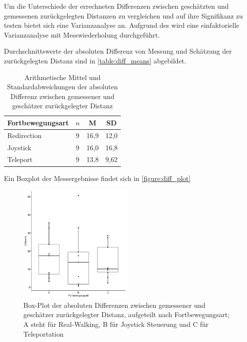                     Um die Unterschiede der errechneten Differenzen zwischen geschätzten und gemessenen zurückgelegten Distanzen zu vergleichen und auf ihre Signifikanz zu testen bietet sich eine Varianzanalyse an.
                    Aufgrund des  wird eine einfaktorielle Varianzanalyse mit Messwiederholung durchgeführt.

                    Durchschnittswerte der absoluten Differenz von Messung und Schätzung der zurückgelegten Distanz sind in \autoref{table:diff_means} abgebildet.

                    \begin{table}[!h]
                        \renewcommand\arraystretch{1.2}
                        \centering
                        \begin{tabular}{lccc} \toprule
                            Fortbewegungsart& $n$ & M    & SD   \\ \midrule
                            Redirection     & $9$ & 16,9 & 12,0 \\
                            Joystick        & $9$ & 16,0 & 16,8 \\
                            Teleport        & $9$ & 13,8 & 9,62 \\ \bottomrule
                        \end{tabular}
                        \caption{Arithmetische Mittel und Standardabweichungen der absoluten Differenz zwischen gemessener und geschätzer zurückgelegter Distanz}\label{table:diff_means}
                    \end{table}

                    Ein Boxplot der Messergebnisse findet sich in \autoref{figure:diff_plot}

                    \begin{figure}[!h]
                        \centering
                        \includegraphics[width=0.5\textwidth]{plots/diff_plot.png}
                        \caption{Box-Plot der absoluten Differenzen zwischen gemessener und geschätzer zurückgelegter Distanz, aufgeteilt nach Fortbewegungsart; A steht für Real-Walking, B für Joystick Steuerung und C für Teleportation}\label{figure:diff_plot}
                    \end{figure}


